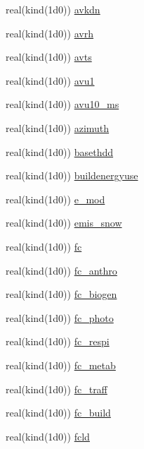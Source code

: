 \begin{DoxyCompactItemize}
real(kind(1d0)) \hyperlink{namespacedata__in_a8ac4d9de71d52d8c39e04c59635a5e3c}{avkdn}
\item 
real(kind(1d0)) \hyperlink{namespacedata__in_a2c6cba95e27ebb1dcb673c457b66325d}{avrh}
\item 
real(kind(1d0)) \hyperlink{namespacedata__in_ab6a63bf1eb3d5838645b22b8f26bc97c}{avts}
\item 
real(kind(1d0)) \hyperlink{namespacedata__in_abc95201410a9b25f8d1d2d5a063302c3}{avu1}
\item 
real(kind(1d0)) \hyperlink{namespacedata__in_ad753c5f26f6cfaac607edf93d4c2dd1d}{avu10\+\_\+ms}
\item 
real(kind(1d0)) \hyperlink{namespacedata__in_a0abb9aefbb8c1dc5ac6ff2f770da7faa}{azimuth}
\item 
real(kind(1d0)) \hyperlink{namespacedata__in_a1e8b73a7f5e115a447c6d8317490a479}{basethdd}
\item 
real(kind(1d0)) \hyperlink{namespacedata__in_a181898a3db2411958a2a0f484e50a9f1}{buildenergyuse}
\item 
real(kind(1d0)) \hyperlink{namespacedata__in_a737780f5cf53c9f2d3048bbfface32cd}{e\+\_\+mod}
\item 
real(kind(1d0)) \hyperlink{namespacedata__in_a262cd82bafaff209c3bca1c3b368931b}{emis\+\_\+snow}
\item 
real(kind(1d0)) \hyperlink{namespacedata__in_a8bc526d8d9a75c1ecef04817aac48046}{fc}
\item 
real(kind(1d0)) \hyperlink{namespacedata__in_ad77982daffd6bf19ea51d6635d9d2009}{fc\+\_\+anthro}
\item 
real(kind(1d0)) \hyperlink{namespacedata__in_a446b6dc73d9c2e2518917361d9b526b3}{fc\+\_\+biogen}
\item 
real(kind(1d0)) \hyperlink{namespacedata__in_a39642f3fc927b3a4394dda8fef2c193b}{fc\+\_\+photo}
\item 
real(kind(1d0)) \hyperlink{namespacedata__in_a5d6aae5bf11940a5ff7437dfec30cd4f}{fc\+\_\+respi}
\item 
real(kind(1d0)) \hyperlink{namespacedata__in_a8676790950975f07daf8d24b503ef952}{fc\+\_\+metab}
\item 
real(kind(1d0)) \hyperlink{namespacedata__in_a9fcca4951f8282ad10df290f8a025387}{fc\+\_\+traff}
\item 
real(kind(1d0)) \hyperlink{namespacedata__in_a3c13cce56632f598e61b00bccdc94e4a}{fc\+\_\+build}
\item 
real(kind(1d0)) \hyperlink{namespacedata__in_a8afa15b03c067e57c570544bd5562ac1}{fcld}
\item 

\end{DoxyCompactItemize}
